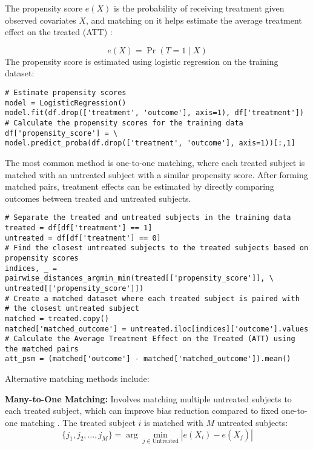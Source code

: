 \documentclass{article}
\begin{document}
The propensity score \(e(X)\) is the probability of receiving treatment given observed covariates \(X\), and matching on it helps estimate the average treatment effect on the treated (ATT) \cite{imbens_nonparametric_2004}:

\[
e(X) = \Pr(T = 1 \mid X)
\]
The propensity score is estimated using logistic regression on the training dataset:

\begin{verbatim}
# Estimate propensity scores
model = LogisticRegression()
model.fit(df.drop(['treatment', 'outcome'], axis=1), df['treatment'])
# Calculate the propensity scores for the training data
df['propensity_score'] = \
model.predict_proba(df.drop(['treatment', 'outcome'], axis=1))[:,1]
\end{verbatim}

\noindent The most common method is one-to-one matching, where each treated subject is matched with an untreated subject with a similar propensity score. After forming matched pairs, treatment effects can be estimated by directly comparing outcomes between treated and untreated subjects.


\begin{verbatim}
# Separate the treated and untreated subjects in the training data
treated = df[df['treatment'] == 1]
untreated = df[df['treatment'] == 0]
# Find the closest untreated subjects to the treated subjects based on propensity scores
indices, _ = pairwise_distances_argmin_min(treated[['propensity_score']], \ 
untreated[['propensity_score']])
# Create a matched dataset where each treated subject is paired with 
# the closest untreated subject
matched = treated.copy()
matched['matched_outcome'] = untreated.iloc[indices]['outcome'].values
# Calculate the Average Treatment Effect on the Treated (ATT) using the matched pairs
att_psm = (matched['outcome'] - matched['matched_outcome']).mean()
\end{verbatim}

\noindent Alternative matching methods include:

\textbf{Many-to-One Matching:}
Involves matching multiple untreated subjects to each treated subject, which can improve bias reduction compared to fixed one-to-one matching \cite{ming2000substantial}. The treated subject \(i\) is matched with \(M\) untreated subjects:
\[
\{j_1, j_2, \ldots, j_M\} = \arg \min_{j \in \text{Untreated}} |e(X_i) - e(X_j)|
\]
\end{document}

